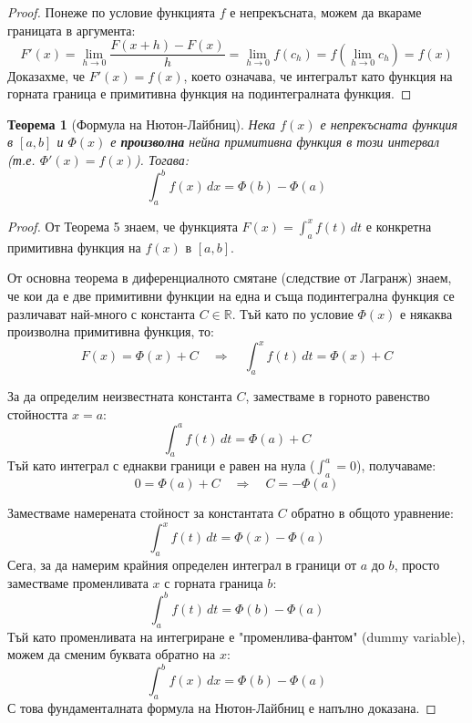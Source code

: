 \documentclass{scrartcl}
\newtheorem{theorem}{Теорема}
\begin{document}
\begin{FlushLeft}
\begin{proof}
Понеже по условие функцията $f$ е непрекъсната, можем да вкараме границата в аргумента:
\[ F'(x) = \lim_{h \to 0} \frac{F(x + h) - F(x)}{h} = \lim_{h \to 0} f(c_h) = f\left(\lim_{h \to 0} c_h\right) = f(x) \]
Доказахме, че $F'(x) = f(x)$, което означава, че интегралът като функция на горната граница е примитивна функция на подинтегралната функция.
\end{proof}

\begin{theorem}[Формула на Нютон-Лайбниц]
Нека $f(x)$ е непрекъсната функция в $[a, b]$ и $\Phi(x)$ е \textbf{произволна} нейна примитивна функция в този интервал (т.е. $\Phi'(x) = f(x)$). Тогава:
\[ \int_{a}^{b} f(x)\,dx = \Phi(b) - \Phi(a) \]
\end{theorem}

\begin{proof}
От Теорема 5 знаем, че функцията $F(x) = \int_{a}^{x} f(t)\,dt$ е конкретна примитивна функция на $f(x)$ в $[a, b]$. 

От основна теорема в диференциалното смятане (следствие от Лагранж) знаем, че кои да е две примитивни функции на една и съща подинтегрална функция се различават най-много с константа $C \in \mathbb{R}$. Тъй като по условие $\Phi(x)$ е някаква произволна примитивна функция, то:
\[ F(x) = \Phi(x) + C \quad \Rightarrow \quad \int_{a}^{x} f(t)\,dt = \Phi(x) + C \]

За да определим неизвестната константа $C$, заместваме в горното равенство стойността $x = a$:
\[ \int_{a}^{a} f(t)\,dt = \Phi(a) + C \]
Тъй като интеграл с еднакви граници е равен на нула ($\int_{a}^{a} = 0$), получаваме:
\[ 0 = \Phi(a) + C \quad \Rightarrow \quad C = -\Phi(a) \]

Заместваме намерената стойност за константата $C$ обратно в общото уравнение:
\[ \int_{a}^{x} f(t)\,dt = \Phi(x) - \Phi(a) \]
Сега, за да намерим крайния определен интеграл в граници от $a$ до $b$, просто заместваме променливата $x$ с горната граница $b$:
\[ \int_{a}^{b} f(t)\,dt = \Phi(b) - \Phi(a) \]
Тъй като променливата на интегриране е "променлива-фантом" (dummy variable), можем да сменим буквата обратно на $x$:
\[ \int_{a}^{b} f(x)\,dx = \Phi(b) - \Phi(a) \]
С това фундаменталната формула на Нютон-Лайбниц е напълно доказана.
\end{proof}

\end{FlushLeft}
\end{document}
